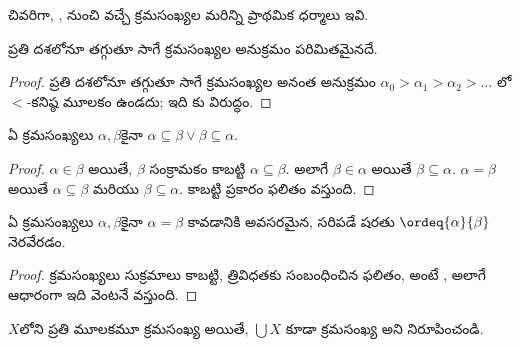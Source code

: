 \documentclass[../../../include/open-logic-section]{subfiles}
\begin{document}
చివరిగా,
,
నుంచి వచ్చే క్రమసంఖ్యల
మరిన్ని ప్రాథమిక
ధర్మాలు ఇవి.

\begin{prop}
ప్రతి దశలోనూ తగ్గుతూ సాగే క్రమసంఖ్యల అనుక్రమం
పరిమితమైనదే.
\end{prop}

\begin{proof}
ప్రతి దశలోనూ తగ్గుతూ సాగే క్రమసంఖ్యల అనంత అనుక్రమం
$\alpha_0 > \alpha_1 > \alpha_2 > \ldots$
లో $<$-కనిష్ఠ
మూలకం ఉండదు;
ఇది కు
విరుద్ధం.
\end{proof}

\begin{prop}
ఏ క్రమసంఖ్యలు
$\alpha, \beta$కైనా
$\alpha \subseteq \beta \lor \beta \subseteq \alpha$.
\end{prop}

\begin{proof}
$\alpha \in \beta$ అయితే,
$\beta$ సంక్రామకం
కాబట్టి $\alpha \subseteq \beta$.
అలాగే $\beta \in \alpha$
అయితే $\beta \subseteq
\alpha$. $\alpha = \beta$
అయితే $\alpha \subseteq \beta$
మరియు $\beta \subseteq \alpha$.
కాబట్టి 
ప్రకారం ఫలితం వస్తుంది.
\end{proof}

\begin{prop}
ఏ క్రమసంఖ్యలు
$\alpha, \beta$కైనా
$\alpha = \beta$ కావడానికి
అవసరమైన, సరిపడే షరతు
$\ordeq{\alpha}{\beta}$ నెరవేరడం.
\end{prop}

\begin{proof}
క్రమసంఖ్యలు సుక్రమాలు కాబట్టి, త్రివిధతకు సంబంధించిన
ఫలితం, అంటే
, అలాగే
ఆధారంగా ఇది వెంటనే వస్తుంది.
\end{proof}

\begin{prob}
$X$లోని ప్రతి మూలకమూ
క్రమసంఖ్య అయితే,
$\bigcup X$ కూడా
క్రమసంఖ్య అని నిరూపించండి.
\end{prob}
\end{document}
